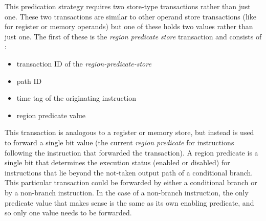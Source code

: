 \documentclass[10pt,twocolumn]{article}
\begin{document}
This predication strategy requires two store-type transactions
rather than just one.  These two transactions are similar
to other operand store transactions (like for register or memory
operands)
but one of these holds two values rather than just one.
The first of these is the \textit{region predicate store}
transaction and consists of :
%
\begin{itemize}
\vspace{-0.15in}
\item{transaction ID of the \textit{region-predicate-store}}
\vspace{-0.15in}
\item{path ID}
\vspace{-0.15in}
\item{time tag of the originating instruction}
\vspace{-0.15in}
\item{region predicate value}
\vspace{-0.15in}
\end{itemize}   
%
This transaction is analogous to a register or memory
store, but instead is used to forward a single bit value (the
current \textit{region predicate} for instructions following the
instruction that forwarded the transaction).  A region predicate
is a single bit that determines the execution status
(enabled or disabled) for instructions that lie beyond the
not-taken output path of a conditional branch.
This particular transaction could be forwarded by either
a conditional branch or by a non-branch instruction.
In the
case of a non-branch instruction, the only
predicate value that makes sense is the same as its
own enabling predicate, and so only one value needs
to be forwarded.
\end{document}
